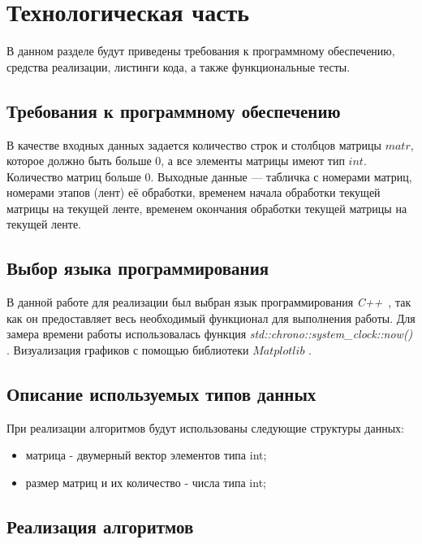 \chapter{Технологическая часть}

В данном разделе будут приведены требования к программному обеспечению, средства реализации, листинги кода, а также функциональные тесты.

\section{Требования к программному обеспечению}

В качестве входных данных задается количество строк и столбцов матрицы $matr$, которое должно быть больше 0, а все элементы матрицы имеют тип $int$. Количество матриц больше 0.
Выходные данные --- табличка с номерами матриц, номерами этапов (лент) её обработки, временем начала обработки текущей матрицы на текущей ленте, временем окончания обработки текущей матрицы на текущей ленте.

\section{Выбор языка программирования}

В данной работе для реализации был выбран язык программирования \textit{C++}~\cite{bib2}, так как он предоставляет весь необходимый функционал для выполнения работы. Для замера времени работы использовалась функция \textit{std::chrono::system\_clock::now()} \cite{bib3}.
Визуализация графиков с помощью библиотеки $Matplotlib$ \cite {bib4}.

\section{Описание используемых типов данных}

При реализации алгоритмов будут использованы следующие структуры данных:
\begin{itemize}[label=---]
	\item матрица - двумерный вектор элементов типа int;
	\item размер матриц и их количество - числа типа int;
\end{itemize}

\section{Реализация алгоритмов}

